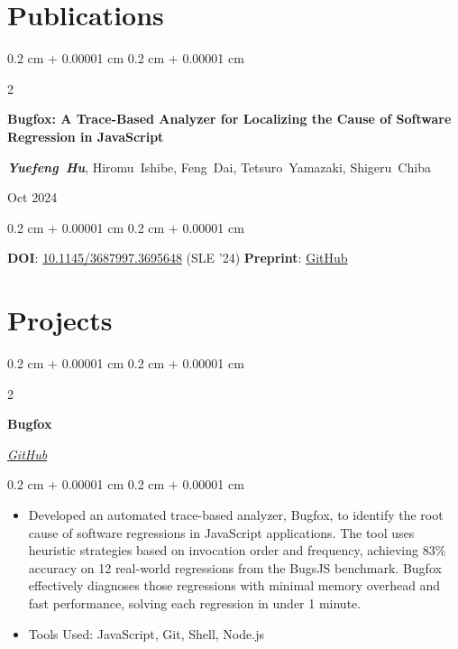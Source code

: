 \documentclass[10pt, letterpaper]{article}
\newenvironment{highlights}{
    \begin{itemize}[
        topsep=0.10 cm,
        parsep=0.10 cm,
        partopsep=0pt,
        itemsep=0pt,
        leftmargin=0.4 cm + 10pt
    ]
}{
    \end{itemize}
} %
\newenvironment{onecolentry}{
    \begin{adjustwidth}{
        0.2 cm + 0.00001 cm
    }{
        0.2 cm + 0.00001 cm
    }
}{
    \end{adjustwidth}
} %
\newenvironment{twocolentry}[2][]{
    \onecolentry
    \def\secondColumn{#2}
    \setcolumnwidth{\fill, 4.5 cm}
    \begin{paracol}{2}
}{
    \switchcolumn \raggedleft \secondColumn
    \end{paracol}
    \endonecolentry
} %
\begin{document}
    
    \section{Publications}



        
        \begin{samepage}
            \begin{twocolentry}{
                Oct 2024
            }
                \textbf{Bugfox: A Trace-Based Analyzer for Localizing the Cause of Software Regression in JavaScript}

                \vspace{0.10 cm}

                \mbox{\textbf{\textit{Yuefeng Hu}}}, \mbox{Hiromu Ishibe}, \mbox{Feng Dai}, \mbox{Tetsuro Yamazaki}, \mbox{Shigeru Chiba}
            \end{twocolentry}


            \vspace{0.10 cm}

            \begin{onecolentry}
				\textbf{DOI}: \href{https://doi.org/10.1145/3687997.3695648}{10.1145/3687997.3695648} (SLE '24)    
				\qquad 
				\textbf{Preprint}: \href{https://icefox99.github.io/publ/SLE2024-Bugfox.pdf}{GitHub}	
			\end{onecolentry}
        \end{samepage}


    
    \section{Projects}



        
        \begin{twocolentry}{
            
            
        \textit{\href{https://github.com/IceFox99/Bugfox}{GitHub}}}
            \textbf{Bugfox}
        \end{twocolentry}

        \vspace{0.10 cm}
        \begin{onecolentry}
            \begin{highlights}
                \item Developed an automated trace-based analyzer, Bugfox, to identify the root cause of software regressions in JavaScript applications. The tool uses heuristic strategies based on invocation order and frequency, achieving 83\% accuracy on 12 real-world regressions from the BugsJS benchmark. Bugfox effectively diagnoses those regressions with minimal memory overhead and fast performance, solving each regression in under 1 minute.
                \item Tools Used: JavaScript, Git, Shell, Node.js
            \end{highlights}
        \end{onecolentry}
\end{document}
